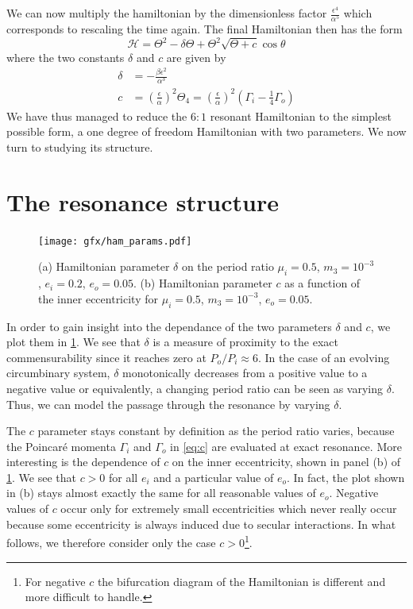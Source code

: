 \documentclass[ twoside,openright,titlepage,numbers=noenddot,headinclude,%
                footinclude=true,cleardoublepage=empty,abstractoff, %
                BCOR=5mm,paper=a4,fontsize=11pt,%
                american,%
                ]{scrreprt}
\begin{document}
We can now multiply the hamiltonian by the dimensionless factor 
$\frac{\epsilon^4}{\alpha^5}$ which corresponds to rescaling the time
again. The final Hamiltonian then has the form
\begin{equation}
    \mathcal{H}= \Theta^2-\delta\Theta +
     \Theta^2\sqrt{\Theta+ c}
    \cos\theta
    \label{eq:hamiltonian_final}
\end{equation}
where the two constants $\delta$ and $c$ are given by
\begin{align}
    \delta&= -\frac{\beta\epsilon^2}{\alpha^3}\label{eq:delta}\\
    c&= \left( \frac{\epsilon}{\alpha} \right)^2 \Theta_4
    =\left( \frac{\epsilon}{\alpha} \right)^2\left(\Gamma_i- \frac{1}{4}
    \Gamma_o\right)\label{eq:c}
\end{align}
We have thus managed to reduce the $6:1$ resonant Hamiltonian to the
simplest possible form, a one degree of freedom Hamiltonian with two
parameters. We now turn to studying its structure.
\section{The resonance structure}
\label{sec:The resonance structure}
\begin{figure}[htb]
\centering
    \texttt{[image: gfx/ham\_params.pdf]}
    \caption{(a) Hamiltonian parameter $\delta$
     on the period ratio $\mu_i=0.5$, $m_3=10^{-3}$, $e_i=0.2$, $e_o=0.05$.
     (b) Hamiltonian parameter $c$ as a function of the inner
     eccentricity for $\mu_i=0.5$, $m_3=10^{-3}$, $e_o=0.05$.}
\label{fig:ham_params}
\end{figure}
In order to gain insight into the dependance of the two parameters $\delta$
and $c$, we plot them in \cref{fig:ham_params}. We see that $\delta$ is a 
measure of proximity to the exact commensurability since it reaches 
zero at $P_o/P_i\approx 6$. In the case of an evolving circumbinary 
system, $\delta$ monotonically decreases from a positive value to a negative
value or equivalently, a changing period ratio can be seen as varying
$\delta$. Thus, we can model the passage through the resonance by varying 
$\delta$.  

The $c$ parameter stays constant by definition as the period ratio varies,
because the Poincaré momenta $\Gamma_i$ and $\Gamma_o$ in \cref{eq:c}
are evaluated at exact resonance. More interesting is the dependence
of $c$ on the inner eccentricity, shown in panel (b) of \cref{fig:ham_params}.
We see that $c>0$ for all $e_i$ and a particular value of $e_o$. In fact, the
plot shown in (b) stays almost exactly the same for all reasonable values
of $e_o$. Negative values of $c$ occur only for extremely small eccentricities
which never really occur because some eccentricity is always induced due to 
secular interactions. In what follows, we therefore consider only the case
$c>0$\footnote{For negative $c$ the bifurcation diagram of the Hamiltonian is
different and more difficult to handle.}.
\end{document}
